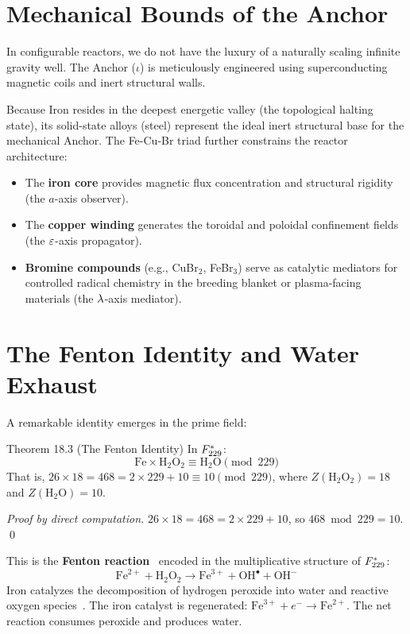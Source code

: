 \section{Mechanical Bounds of the Anchor}

In configurable reactors, we do not have the luxury of a naturally scaling infinite gravity well. The Anchor ($\iota$) is meticulously engineered using superconducting magnetic coils and inert structural walls. 

Because Iron resides in the deepest energetic valley (the topological halting state), its solid-state alloys (steel) represent the ideal inert structural base for the mechanical Anchor. The Fe-Cu-Br triad further constrains the reactor architecture:

\begin{itemize}
    \item The \textbf{iron core} provides magnetic flux concentration and structural rigidity (the $a$-axis observer).
    \item The \textbf{copper winding} generates the toroidal and poloidal confinement fields (the $\varepsilon$-axis propagator).
    \item \textbf{Bromine compounds} (e.g., CuBr$_2$, FeBr$_3$) serve as catalytic mediators for controlled radical chemistry in the breeding blanket or plasma-facing materials (the $\lambda$-axis mediator).
\end{itemize}

\section{The Fenton Identity and Water Exhaust}

A remarkable identity emerges in the prime field:

\begin{theorembox}{Theorem 18.3 (The Fenton Identity)}
In $F_{229}^*$:
\[ \text{Fe} \times \text{H}_2\text{O}_2 \equiv \text{H}_2\text{O} \pmod{229} \]
That is, $26 \times 18 = 468 = 2 \times 229 + 10 \equiv 10 \pmod{229}$, where $Z(\text{H}_2\text{O}_2) = 18$ and $Z(\text{H}_2\text{O}) = 10$.
\end{theorembox}

\begin{proof}[Proof by direct computation]
$26 \times 18 = 468 = 2 \times 229 + 10$, so $468 \bmod 229 = 10$. \qed
\end{proof}

\noindent This is the \textbf{Fenton reaction}~\cite{Fenton1894} encoded in the multiplicative structure of $F_{229}^*$:
\[ \text{Fe}^{2+} + \text{H}_2\text{O}_2 \to \text{Fe}^{3+} + \text{OH}^\bullet + \text{OH}^- \]
Iron catalyzes the decomposition of hydrogen peroxide into water and reactive oxygen species~\cite{Buxton1988Radiolysis}. The iron catalyst is regenerated: $\text{Fe}^{3+} + e^- \to \text{Fe}^{2+}$. The net reaction consumes peroxide and produces water.

